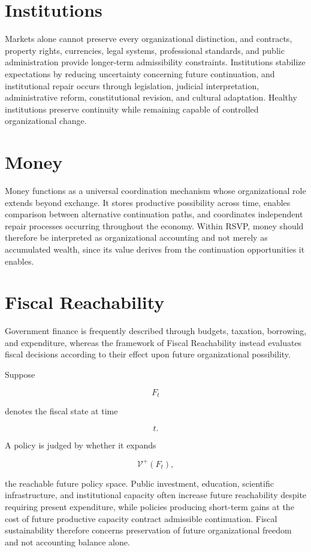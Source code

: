 \documentclass[11pt,oneside]{book}
\numberwithin{equation}{chapter}
\theoremstyle{definition}
\theoremstyle{plain}
\begin{document}
\section{Institutions}

Markets alone cannot preserve every organizational distinction, and contracts, property rights, currencies, legal systems, professional standards, and public administration provide longer-term admissibility constraints. Institutions stabilize expectations by reducing uncertainty concerning future continuation, and institutional repair occurs through legislation, judicial interpretation, administrative reform, constitutional revision, and cultural adaptation. Healthy institutions preserve continuity while remaining capable of controlled organizational change.

\section{Money}

Money functions as a universal coordination mechanism whose organizational role extends beyond exchange. It stores productive possibility across time, enables comparison between alternative continuation paths, and coordinates independent repair processes occurring throughout the economy. Within RSVP, money should therefore be interpreted as organizational accounting and not merely as accumulated wealth, since its value derives from the continuation opportunities it enables.

\section{Fiscal Reachability}

Government finance is frequently described through budgets, taxation, borrowing, and expenditure, whereas the framework of Fiscal Reachability instead evaluates fiscal decisions according to their effect upon future organizational possibility.

Suppose

\[
F_t
\]

denotes the fiscal state at time

\[
t.
\]

A policy is judged by whether it expands

\[
\mathcal V^+(F_t),
\]

the reachable future policy space. Public investment, education, scientific infrastructure, and institutional capacity often increase future reachability despite requiring present expenditure, while policies producing short-term gains at the cost of future productive capacity contract admissible continuation. Fiscal sustainability therefore concerns preservation of future organizational freedom and not accounting balance alone.
\end{document}
